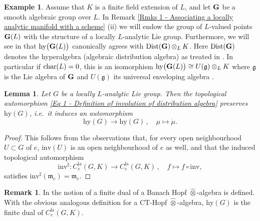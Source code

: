 \documentclass[a4paper, reqno, 10pt]{amsart}
\newtheorem{lemma}[theorem]{Lemma}
\theoremstyle{definition}
\newtheorem{example}[theorem]{Example}
\newtheorem{remark}[theorem]{Remark}
\numberwithin{equation}{section}
\newcommand{\botimes}[1]{{\,\otimes_{#1}\,}}
\newcommand{\hy}{{\mathrm{hy}}}
\newcommand{\inv}{{\mathrm{inv}}}
\newcommand{\la}{{\mathrm{la}}}
\newcommand{\lra}{\longrightarrow}
\newcommand{\lto}{\longmapsto}
\newcommand{\bG}{{\mathrm{\bf G}}}
\newcommand{\Fg}{{\mathfrak {g}}}
\newcommand{\Fm}{{\mathfrak {m}}}
\begin{document}
\begin{example}
	Assume that $K$ is a finite field extension of $L$, and let $\bG$ be a smooth algebraic group over $L$.
	In Remark \ref{Rmks 1 - Associating a locally analytic manifold with a scheme} (ii) we will endow the group of $L$-valued points $\bG(L)$ with the structure of a locally $L$-analytic Lie group.
	Furthermore, we will see in  that $\hy\big(\bG(L) \big)$ canonically agrees with ${\rm Dist}(\bG) \botimes{L} K$.
	Here ${\rm Dist}(\bG)$ denotes the hyperalgebra (algebraic distribution algebra) as treated in \cite[I.\ Ch.7]{Jantzen03RepAlgGrp}.
	In particular if ${\rm char}(L)=0$, this is an isomorphism $\hy\big(\bG(L) \big) \cong U(\Fg)\otimes_L K$ where $\Fg$ is the Lie algebra of $\bG$ and $U(\Fg)$ its universal enveloping algebra \cite[I.\ \S 7.10]{Jantzen03RepAlgGrp}.
\end{example}


\begin{lemma}\label{Lemma 1 - Involution of hyperalgebra}
	Let $G$ be a locally $L$-analytic Lie group.
	Then the topological automorphism \eqref{Eq 1 - Definition of involution of distribution algebra} preserves $\hy(G)$, i.e.\ it induces an automorphism
	\begin{equation*}
		\hy(G) \lra \hy(G) \,,\quad \mu \lto \dot{\mu}.
	\end{equation*}
\end{lemma}
\begin{proof}
	This follows from the observations that, for every open neighbourhood $U\subset G$ of $e$, $\inv(U)$ is an open neighbourhood of $e$ as well, and that the induced topological automorphism
	\begin{equation*}
		\inv^\sharp \colon C^\la_e(G,K) \lra C^\la_e(G,K) \,,\quad f \lto f\circ \inv,
	\end{equation*}
	satisfies $\inv^\sharp(\Fm_e) = \Fm_e$.
\end{proof}



\begin{remark}
	In \cite[Ch.\ 1.2.1]{Lyubinin14NonArchCoAlgCoadmMod} the notion of a finite dual of a Banach Hopf $\widehat{\otimes}$-algebra is defined.
	With the obvious analogous definition for a CT-Hopf $\widehat{\otimes}$-algebra, $\hy(G)$ is the finite dual of $C^\la_e(G,K)$.
\end{remark}
\end{document}
